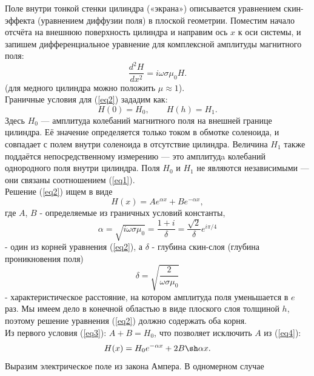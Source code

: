 \documentclass[a4paper,12pt]{article}
\theoremstyle{plain} %
\theoremstyle{definition} %
\theoremstyle{remark} %
\begin{document}
	\indent Поле внутри тонкой стенки цилиндра («экрана») описывается уравнением скин-эффекта (уравнением диффузии поля) в плоской геометрии. Поместим начало отсчёта на внешнюю поверхность цилиндра и направим ось $x$ к оси системы, и запишем дифференциальное уравнение для комплексной амплитуды магнитного поля:
	\begin{equation}\label{eq2}
		\frac{d^2H}{dx^2} = i \omega \sigma \mu_0 H.
	\end{equation}
	(для медного цилиндра можно положить $\mu \approx 1$).\\
	\indent Граничные условия для (\ref{eq2}) зададим как:
	\begin{equation}\label{eq3}
		H(0) = H_0, \qquad H(h) = H_1.
	\end{equation}
	Здесь $H_0$ — амплитуда колебаний магнитного поля на внешней границе цилиндра. Её значение определяется только током в обмотке соленоида, и совпадает с полем внутри соленоида в отсутствие цилиндра. Величина $H_1$ также поддаётся непосредственному измерению — это амплитудa колебаний однородного поля внутри цилиндра. Поля $H_0$ и $H_1$ не являются независимыми — они связаны соотношением (\ref{eq1}).\\
	\indent Решение (\ref{eq2}) ищем в виде
	\begin{equation}\label{eq4}
		H(x) = A e^{\alpha x} + B e^{-\alpha x},
	\end{equation}
	где $A$, $B$ - определяемые из граничных условий константы,
	\begin{equation}\label{eq5}
		\alpha = \sqrt{i \omega \sigma \mu_0} = \frac{1 + i}{\delta} = \frac{\sqrt{2}}{\delta} e^{i \pi/4}
	\end{equation}
	- один из корней уравнения (\ref{eq2}), а $\delta$ - глубина скин-слоя (глубина проникновения поля) 
	\begin{equation}\label{eqdelta}
		\delta = \sqrt{\frac{2}{\omega \sigma \mu_0}}
	\end{equation}
	- характеристическое расстояние, на котором амплитуда поля уменьшается в $e$ раз. Мы имеем дело в конечной областью в виде плоского слоя толщиной $h$, поэтому решение уравнения (\ref{eq2}) должно содержать оба корня.\\
	\indent Из первого условия (\ref{eq3}): $A + B = H_0$, что позволяет исключить $A$ из (\ref{eq4}):
	\begin{equation*}
		H(x) = H_0 e^{-\alpha x} + 2B \sh \alpha x.
	\end{equation*}
	\indent Выразим электрическое поле из закона Ампера. В одномерном случае\\
	
\end{document}
